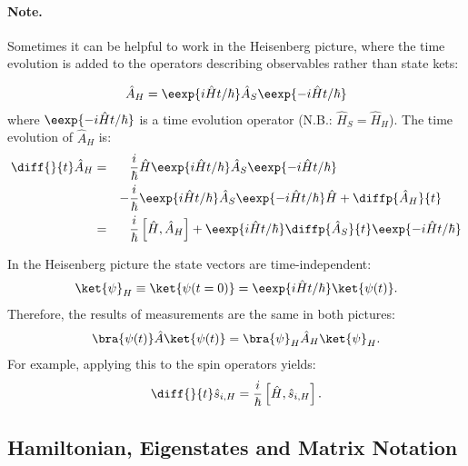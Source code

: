 				\paragraph{Note.} Sometimes it can be helpful to work in the Heisenberg picture, where the time evolution is added to the operators describing observables rather than state kets:

					\begin{align}
						\hat{A}_H=\eexp{i{\hat{H} t}/{\hbar}} \hat{A}_S \eexp{-i{\hat{H} t}/{\hbar}}
					\end{align}
					where $\eexp{-i{\hat{H} t}/{\hbar}}$ is a time evolution operator (N.B.: $\hat{H}_S = \hat{H}_H$). The time evolution of $\hat{A}_H$ is:
					\begin{align}
						\notag \diff{}{t} \hat{A}_H &=&& \frac{i}{\hbar}\hat{H}\eexp{i{\hat{H}t}/{\hbar}}\hat{A}_S \eexp{-i{\hat{H} t}/{\hbar}}\\ 
						&&-&\frac{i}{\hbar} \eexp{i{\hat{H} t}/{\hbar}}\hat{A}_S \eexp{-i{\hat{H}t}/{\hbar}}\hat{H}+\diffp{\hat{A}_H}{t}\\
						&=&& \frac{i}{\hbar}\left[\hat{H},\hat{A}_H\right] + \eexp{i{\hat{H}t}/{\hbar}}\diffp{\hat{A}_S}{t}\eexp{-i{\hat{H}t}/{\hbar}}
					\end{align}

					In the Heisenberg picture the state vectors are time-in\-de\-pen\-dent:
					\begin{align}
						\ket{\psi}_H \equiv \ket{\psi(t=0)}=\eexp{i{\hat{H}}t/{\hbar}} \ket{\psi(t)}.
					\end{align}
					Therefore, the results of measurements are the same in both pictures:
					\begin{align}
						\bra{\psi(t)}\hat{A}\ket{\psi(t)} = \bra{\psi}_H \hat{A}_H \ket{\psi}_H.
					\end{align}
					For example, applying this to the spin operators yields:
					\begin{align}
						\diff{}{t}\hat{s}_{i,H}=\frac{i}{\hbar}\left[\hat{H},\hat{s}_{i,H}\right].
					\end{align}

		\subsection{Hamiltonian, Eigenstates and Matrix Notation}

